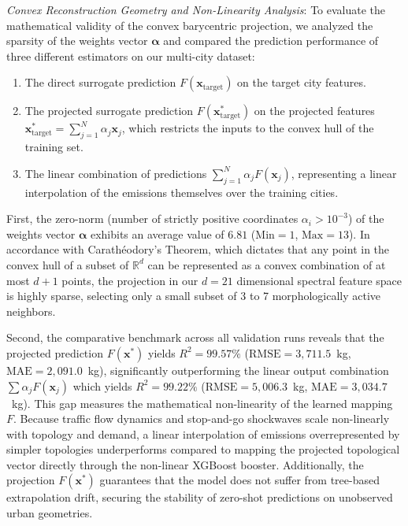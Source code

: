 \documentclass[lettersize,journal]{IEEEtran}
\begin{document}
\textit{Convex Reconstruction Geometry and Non-Linearity Analysis}:
To evaluate the mathematical validity of the convex barycentric projection, we analyzed the sparsity of the weights vector $\boldsymbol{\alpha}$ and compared the prediction performance of three different estimators on our multi-city dataset:
\begin{enumerate}
    \item The direct surrogate prediction $F(\mathbf{x}_{\text{target}})$ on the target city features.
    \item The projected surrogate prediction $F(\mathbf{x}^*_{\text{target}})$ on the projected features $\mathbf{x}^*_{\text{target}} = \sum_{j=1}^N \alpha_j \mathbf{x}_j$, which restricts the inputs to the convex hull of the training set.
    \item The linear combination of predictions $\sum_{j=1}^N \alpha_j F(\mathbf{x}_j)$, representing a linear interpolation of the emissions themselves over the training cities.
\end{enumerate}
First, the zero-norm (number of strictly positive coordinates $\alpha_i > 10^{-3}$) of the weights vector $\boldsymbol{\alpha}$ exhibits an average value of $6.81$ ($\text{Min} = 1$, $\text{Max} = 13$). In accordance with Carathéodory's Theorem, which dictates that any point in the convex hull of a subset of $\mathbb{R}^d$ can be represented as a convex combination of at most $d+1$ points, the projection in our $d=21$ dimensional spectral feature space is highly sparse, selecting only a small subset of 3 to 7 morphologically active neighbors.

Second, the comparative benchmark across all validation runs reveals that the projected prediction $F(\mathbf{x}^*)$ yields $R^2 = 99.57\%$ ($\text{RMSE} = 3,711.5$~kg, $\text{MAE} = 2,091.0$~kg), significantly outperforming the linear output combination $\sum \alpha_j F(\mathbf{x}_j)$ which yields $R^2 = 99.22\%$ ($\text{RMSE} = 5,006.3$~kg, $\text{MAE} = 3,034.7$~kg). This gap measures the mathematical non-linearity of the learned mapping $F$. Because traffic flow dynamics and stop-and-go shockwaves scale non-linearly with topology and demand, a linear interpolation of emissions overrepresented by simpler topologies underperforms compared to mapping the projected topological vector directly through the non-linear XGBoost booster. Additionally, the projection $F(\mathbf{x}^*)$ guarantees that the model does not suffer from tree-based extrapolation drift, securing the stability of zero-shot predictions on unobserved urban geometries.
\end{document}
